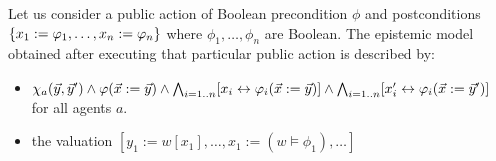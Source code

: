 \documentclass{article}
\begin{document}
Let us consider a public action of Boolean precondition $\phi$ and postconditions ${\{x_1 := \varphi_1, \dots, x_n := \varphi_n\}}$ where $\phi_1, \dots, \phi_n$ are Boolean. The epistemic model obtained after executing that particular public action is described by:
\begin{itemize}
	\item $\chi_a(\vec y, \vec y')  \land \varphi(\vec x := \vec y) \land \bigwedge_{i=1..n} [x_i \leftrightarrow \varphi_i(\vec x := \vec y)] \land \bigwedge_{i=1..n} [x_i' \leftrightarrow \varphi_i(\vec x := \vec y')]$ for all agents $a$.
	\item the valuation $[y_1 := w[x_1], \dots, x_1 := (w \models \phi_1), \dots]$
\end{itemize}










%
%












\end{document}
